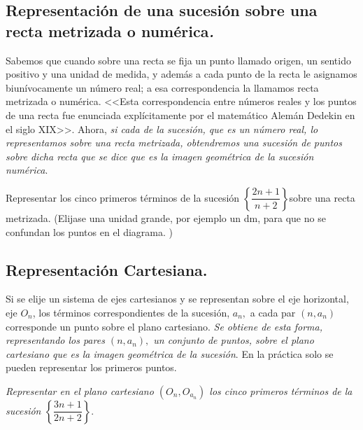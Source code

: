 \subsection{Representación de una sucesión sobre una recta metrizada o numérica\textsl{.}}
\begin{flushleft}
Sabemos que cuando sobre una recta se fija un punto llamado origen,
un sentido positivo y una unidad de medida, y además a cada punto
de la recta le asignamos biunívocamente un número real; a esa correspondencia
la llamamos recta metrizada o numérica. <<Esta correspondencia entre
números reales y los puntos de una recta fue enunciada explícitamente
por el matemático Alemán Dedekin en el siglo XIX>>.\linebreak{}
Ahora, \textsl{si cada de la sucesión, que es un número real, lo representamos
sobre una recta metrizada, obtendremos una sucesión de puntos sobre
dicha recta que se dice que es la imagen geométrica de la sucesión
numérica}.\textsl{\large{}}\linebreak{}
\begin{ejercicio} \vspace{1pt}
Representar los cinco primeros términos de la sucesión $\left\{ \dfrac{2n+1}{n+2}\right\} $sobre
una recta metrizada. (Elijase una unidad grande, por ejemplo un \si{dm},
para que no se confundan los puntos en el diagrama. )\end{ejercicio}
\par\end{flushleft}

\subsection{Representación Cartesiana.}
\begin{flushleft}
Si se elije un sistema de ejes cartesianos y se representan sobre
el eje horizontal, eje $O_{n}$, los términos correspondientes de
la sucesión, $a_{n},$ a cada par $\left(n,a_{n}\right)$ corresponde
un punto sobre el plano cartesiano. \textsl{Se obtiene de esta forma,
representando los pares $(n,a_{n}),$ un conjunto de puntos, sobre
el plano cartesiano que es la imagen geométrica de la sucesión}. \linebreak{}
En la práctica solo se pueden representar los primeros puntos.\linebreak{}
\begin{ejercicio}[]\textsl{Representar en el plano cartesiano $\left(O_{n},O_{a_{n}}\right)$
los cinco primeros términos de la sucesión $\left\{ \dfrac{3n+1}{2n+2}\right\} .$}\end{ejercicio}
\par\end{flushleft}

